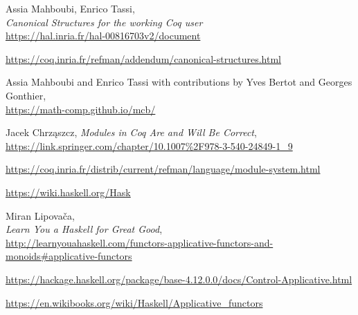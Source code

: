 \documentclass[declaration,inz,english,shortabstract]{iithesis}
\begin{document}
\begin{thebibliography}{1}
        Assia Mahboubi, Enrico Tassi, \\
        \textit{Canonical Structures for the working Coq user} \\
        \url{https://hal.inria.fr/hal-00816703v2/document}

        \url{https://coq.inria.fr/refman/addendum/canonical-structures.html}

        Assia Mahboubi and Enrico Tassi with contributions by Yves Bertot and Georges Gonthier, \\
        \url{https://math-comp.github.io/mcb/}

        Jacek Chrząszcz,
        \textit{Modules in Coq Are and Will Be Correct}, \\
        \url{https://link.springer.com/chapter/10.1007%2F978-3-540-24849-1_9}

        \url{https://coq.inria.fr/distrib/current/refman/language/module-system.html}

        \url{https://wiki.haskell.org/Hask}

        Miran Lipovača, \\
        \textit{Learn You a Haskell for Great Good}, \\
        \url{http://learnyouahaskell.com/functors-applicative-functors-and-monoids#applicative-functors}

        \url{https://hackage.haskell.org/package/base-4.12.0.0/docs/Control-Applicative.html}

        \url{https://en.wikibooks.org/wiki/Haskell/Applicative_functors}
\end{thebibliography}

\end{document}
